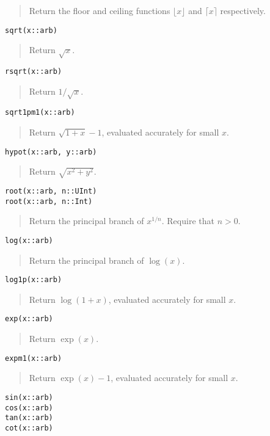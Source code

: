 \documentclass[a4paper,10pt]{article}
\newcommand{\desc}[1]{\vspace{-3mm}\begin{quote}#1\end{quote}}
\begin{document}
{{\desc{Return the floor and ceiling functions $\lfloor x \rfloor$ and
$\lceil x \rceil$ respectively.}

\begin{lstlisting}
sqrt(x::arb)
\end{lstlisting}

\desc{Return $\sqrt{x}$.}

\begin{lstlisting}
rsqrt(x::arb)
\end{lstlisting}

\desc{Return $1 / \sqrt{x}$.}

\begin{lstlisting}
sqrt1pm1(x::arb)
\end{lstlisting}

\desc{Return $\sqrt{1+x}-1$, evaluated accurately for small $x$.}

\begin{lstlisting}
hypot(x::arb, y::arb)
\end{lstlisting}

\desc{Return $\sqrt{x^2 + y^2}$.}

\begin{lstlisting}
root(x::arb, n::UInt)
root(x::arb, n::Int)
\end{lstlisting}

\desc{Return the principal branch of $x^{1/n}$. Require that $n > 0$.}

\begin{lstlisting}
log(x::arb)
\end{lstlisting}

\desc{Return the principal branch of $\log(x)$.}

\begin{lstlisting}
log1p(x::arb)
\end{lstlisting}

\desc{Return $\log(1+x)$, evaluated accurately for small $x$.}

\begin{lstlisting}
exp(x::arb)
\end{lstlisting}

\desc{Return $\exp(x)$.}

\begin{lstlisting}
expm1(x::arb)
\end{lstlisting}

\desc{Return $\exp(x)-1$, evaluated accurately for small $x$.}

\begin{lstlisting}
sin(x::arb)
cos(x::arb)
tan(x::arb)
cot(x::arb)
\end{lstlisting}

}}
\end{document}
